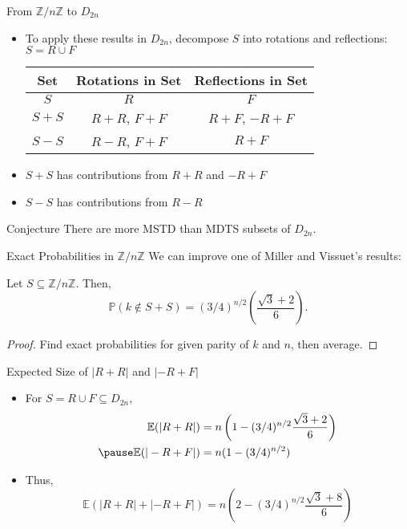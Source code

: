 \documentclass{beamer}
\newcommand{\bi}{\begin{itemize}}
\newcommand{\ei}{\end{itemize}}
\newcommand{\pr}{\mathbb{P}}
\newcommand{\Z}{\mathbb{Z}}
\newcommand{\znz}{\Z / n \Z}
\newcommand{\E}{\mathbb{E}}
\begin{document}
\begin{frame}{From $\znz$ to $D_{2n}$}
\bi
	\item To apply these results in $D_{2n}$, decompose $S$ into rotations and reflections: $S = R \cup F$
		\pause
		\smallskip
		\begin{center}
			\begin{tabular}{|c|c|c|}\hline
				\textbf{Set} & \textbf{Rotations in Set} & \textbf{Reflections in Set}\\\hline
				$S$	 & $R$			  & $F$\\\hline
				$S + S$ & $R + R$, $F + F$ & $R + F$, $-R + F$\\\hline
				$S - S$ & $R - R$, $F + F$ & $R + F$\\\hline
			\end{tabular}
		\end{center}
		\pause
		\smallskip
	\item $S + S$ has contributions from $R + R$ and $-R + F$
		\pause
		\smallskip
	\item $S - S$ has contributions from $R - R$
\ei
\pause
\begin{alertblock}{Conjecture}
	There are more MSTD than MDTS subsets of $D_{2n}$.
\end{alertblock}
\end{frame}

\begin{frame}{Exact Probabilities in $\znz$}
We can improve one of Miller and Vissuet's results:

\pause
\medskip

\begin{theorem}[SMALL 2020]
	Let $S \subseteq \znz$. Then,
	\[
	\pr(k \notin S + S) = (3/4)^{n / 2} \left( \frac{\sqrt{3} + 2}{6} \right).
	\]
\end{theorem}

\pause
\bigskip

\begin{proof}
	Find exact probabilities for given parity of $k$ and $n$, then average.
\end{proof}
\end{frame}

\begin{frame}{Expected Size of $|R + R|$ and $|-R + F|$}
\bi
	\item For $S = R \cup F \subseteq D_{2n}$,
		\begin{align*}
			\E(|R + R|) &= n \left( 1 - (3/4)^{n / 2} \frac{\sqrt{3} + 2}{6} \right)\\ \pause
			\E(|-R + F|) &= n(1 - (3/4)^{n / 2})
		\end{align*}
		\pause
		\bigskip
	\item Thus,
		\[
		\E(|R + R| + |-R + F|) = n \left( 2 - (3/4)^{n / 2}\frac{\sqrt{3} + 8}{6} \right)
		\]
\ei
\end{frame}
\end{document}

